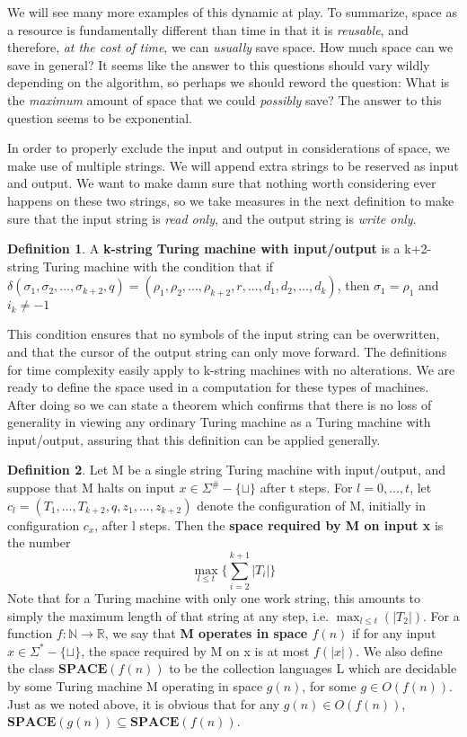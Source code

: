 \documentclass{article}
\theoremstyle{definition}
\newtheorem{definition}{Definition}[section]
\theoremstyle{plain}
\theoremstyle{theorem}
\begin{document}
\par We will see many more examples of this dynamic at play. To summarize, space as a resource is fundamentally different than time in that it is \textit{reusable}, and therefore, \textit{at the cost of time}, we can \textit{usually} save space. How much space can we save in general? It seems like the answer to this questions should vary wildly depending on the algorithm, so perhaps we should reword the question: What is the \textit{maximum} amount of space that we could \textit{possibly} save? The answer to this question seems to be exponential.  
\par In order to properly exclude the input and output in considerations of space, we make use of multiple strings. We will append extra strings to be reserved as input and output. We want to make damn sure that nothing worth considering ever happens on these two strings, so we take measures in the next definition to make sure that the input string is \textit{read only}, and the output string is \textit{write only}.
\begin{definition}
A \textbf{k-string Turing machine with input/output} is a k+2-string Turing machine with the condition that if $\delta(\sigma_1,\sigma_2,...,\sigma_{k+2},q)=(\rho_1,\rho_2,...,\rho_{k+2},r,...,d_1,d_2,...,d_k)$, then $\sigma_1 = \rho_1$ and $i_k \neq -1$
\end{definition}
\par This condition ensures that no symbols of the input string can be overwritten, and that the cursor of the output string can only move forward. 
The definitions for time complexity easily apply to k-string machines with no alterations. We are ready to define the space used in a computation for these types of machines. After doing so we can state a theorem which confirms that there is no loss of generality in viewing any ordinary Turing machine as a Turing machine with input/output, assuring that this definition can be applied generally.
\begin{definition}
Let M be a single string Turing machine with input/output, and suppose that M halts on input $x \in \Sigma^\#-\{\sqcup\}$ after t steps. For $l=0,...,t$, let $c_l = (T_1,...,T_{k+2},q,z_1,...,z_{k+2})$ denote the configuration of M, initially in configuration $c_x$, after l steps. Then the \textbf{space required by M on input x} is the number
\[\max_{l\leq t}\{\sum_{i=2}^{k+1}|T_i|\} \] 
Note that for a Turing machine with only one work string, this amounts to simply the maximum length of that string at any step, i.e. $\max_{l \leq t}(|T_2|)$. For a function $f:\mathbb{N}\to \mathbb{R}$, we say that \textbf{M operates in space $f(n)$} if for any input $x \in \Sigma^*-\{\sqcup\}$, the space required by M on x is at most $f(|x|)$. 
We also define the class $\bm{SPACE}(f(n))$ to be the collection languages L which are decidable by some Turing machine M operating in space $g(n)$, for some $g \in O(f(n))$. Just as we noted above, it is obvious that for any $g(n) \in O(f(n))$, $\bm{SPACE}(g(n)) \subseteq \bm{SPACE}(f(n))$.
\end{definition}
\end{document}
